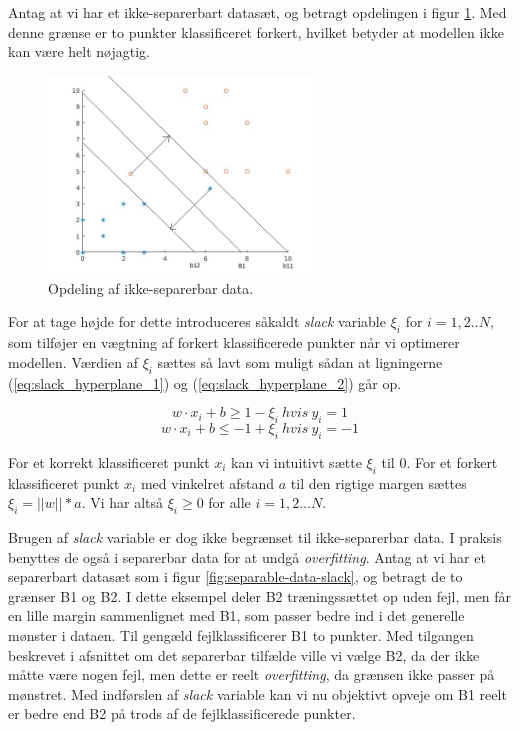 \documentclass{article}
\begin{document}
Antag at vi har et ikke-separerbart datasæt, og betragt opdelingen i figur \ref{fig:non-separable-data}. Med denne grænse er to punkter klassificeret forkert, hvilket betyder at modellen ikke kan være helt nøjagtig.

\begin{figure}[H]
	\begin{center} 
	\includegraphics[width=7cm]{svm_plot_1_2}
	\end{center}
	\caption{Opdeling af ikke-separerbar data.}
	\label{fig:non-separable-data}
\end{figure}

For at tage højde for dette introduceres såkaldt \textit{slack} variable $\xi_i$ for $i=1,2..N$, som tilføjer en vægtning af forkert klassificerede punkter når vi optimerer modellen. Værdien af $\xi_i$ sættes så lavt som muligt sådan at ligningerne (\ref{eq:slack_hyperplane_1}) og (\ref{eq:slack_hyperplane_2}) går op.

\begin{equation}
\label{eq:slack_hyperplane_1}
w \cdot x_i + b \geq 1 - \xi_i \ hvis \ y_i = 1
\end{equation}
\begin{equation}
\label{eq:slack_hyperplane_2}
w \cdot x_i + b \leq -1 +\xi_i \ hvis \ y_i = -1
\end{equation}

For et korrekt klassificeret punkt $x_i$ kan vi intuitivt sætte $\xi_i$ til 0. For et forkert klassificeret punkt $x_i$ med vinkelret afstand $a$ til den rigtige margen sættes $\xi_i=||w||*a$. Vi har altså $\xi_i\geq 0$ for alle $i=1,2...N$.

Brugen af \textit{slack} variable er dog ikke begrænset til ikke-separerbar data. I praksis benyttes de også i separerbar data for at undgå \textit{overfitting}. Antag at vi har et separerbart datasæt som i figur \ref{fig:separable-data-slack}, og betragt de to grænser B1 og B2. I dette eksempel deler B2 træningssættet op uden fejl, men får en lille margin sammenlignet med B1, som passer bedre ind i det generelle mønster i dataen. Til gengæld fejlklassificerer B1 to punkter. Med tilgangen beskrevet i afsnittet om det separerbar tilfælde ville vi vælge B2, da der ikke måtte være nogen fejl, men dette er reelt \textit{overfitting}, da grænsen ikke passer på mønstret. Med indførslen af \textit{slack} variable kan vi nu objektivt opveje om B1 reelt er bedre end B2 på trods af de fejlklassificerede punkter.
\end{document}
